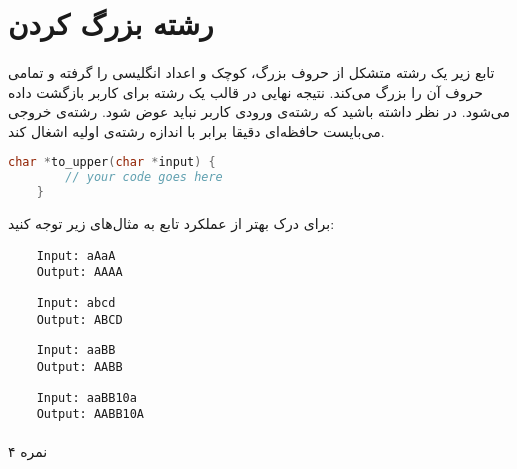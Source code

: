 \documentclass[../main.tex]{subfiles}
\begin{document}
\section{رشته بزرگ کردن}
\paragraph{}
تابع زیر یک رشته متشکل از حروف بزرگ، کوچک و اعداد انگلیسی را گرفته
و تمامی حروف آن را بزرگ می‌کند. نتیجه نهایی در قالب یک رشته برای کاربر بازگشت داده می‌شود.
در نظر داشته باشید که رشته‌ی ورودی کاربر نباید عوض شود.
رشته‌ی خروجی می‌بایست حافظه‌ای دقیقا برابر با اندازه رشته‌ی اولیه اشغال کند.

\begin{latin}
\begin{lstlisting}[language=c]
    char *to_upper(char *input) {
        // your code goes here
    }
\end{lstlisting}
\end{latin}

برای درک بهتر از عملکرد تابع به مثال‌های زیر توجه کنید:

\begin{latin}
\begin{verbatim}
    Input: aAaA
    Output: AAAA
\end{verbatim}

\begin{verbatim}
    Input: abcd
    Output: ABCD
\end{verbatim}

\begin{verbatim}
    Input: aaBB
    Output: AABB
\end{verbatim}

\begin{verbatim}
    Input: aaBB10a
    Output: AABB10A
\end{verbatim}
\end{latin}

\paragraph{}
۴ نمره
\end{document}
